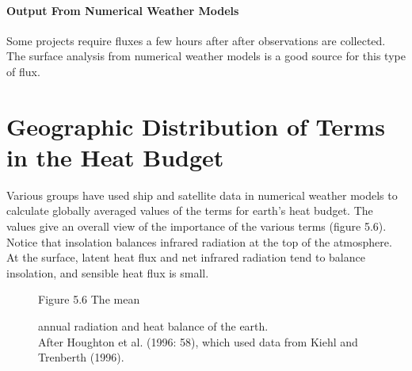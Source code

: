 \paragraph{Output From Numerical Weather Models}
Some projects require fluxes a few hours after after observations are
collected. The surface analysis from numerical
weather models is a good source for this type of flux.

\section[Geographic Distribution of Terms]{Geographic Distribution of Terms in
the Heat Budget} Various groups have used ship and satellite data in numerical
weather models to calculate globally averaged values of the terms for
earth's heat budget. The values give an overall view of the importance
of the various terms (figure 5.6).  Notice that
insolation balances infrared
radiation at the top of the atmosphere. At the surface, latent heat
flux and net infrared radiation tend to balance
insolation, and sensible heat
flux is small.

\begin{figure}[t!]
\centering
\footnotesize
Figure 5.6 The mean \rule{0mm}{4ex}annual radiation and heat balance
of the earth. \\After Houghton et al. (1996: 58), which used data from
Kiehl and Trenberth (1996).
\label{fig:heatbudget}
\vspace{-2ex}
\end{figure}

